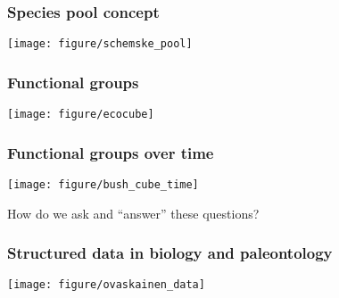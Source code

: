 \documentclass{beamer}
\begin{document}
\begin{frame}
  \frametitle{Species pool concept}

  \begin{center}
    \texttt{[image: figure/schemske\_pool]}
  \end{center}

  \tiny{}
\end{frame}

\begin{frame}
  \frametitle{Functional groups}

  \begin{center}
    \texttt{[image: figure/ecocube]}
  \end{center}

  \tiny{}
\end{frame}

\begin{frame}
  \frametitle{Functional groups over time}

  \begin{center}
    \texttt{[image: figure/bush\_cube\_time]}
  \end{center}

  \tiny{}
\end{frame}


\begin{frame}
  \begin{alertblock}{How do we ask and ``answer'' these questions?}

  \end{alertblock}
\end{frame}


\begin{frame}
  \frametitle{Structured data in biology and paleontology}

  \begin{center}
    \texttt{[image: figure/ovaskainen\_data]}
  \end{center}

  \tiny{}
\end{frame}
\end{document}
